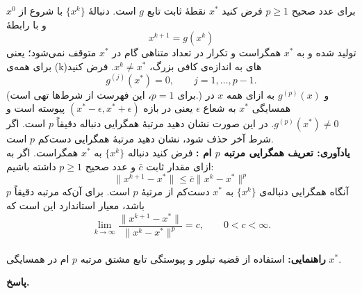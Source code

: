 
برای عدد صحیح
\(p\geq1\)
فرض کنید
\(x^*\)
نقطهٔ ثابت تابع
\(g\)
است. دنبالهٔ
\(\{x^k\}\)
با شروع از
\(x^0\)
و با رابطهٔ
\[
 x^{k+1}=g(x^k)
\]
تولید شده و به
\(x^*\)
همگراست و تکرار در تعداد متناهی گام در
\(x^*\)
متوقف نمی‌شود؛ یعنی برای همه‌ی (k)های به اندازه‌ی کافی بزرگ،
\(x^k\neq x^*\).
فرض کنید
	\[g^{(j)}(x^*)=0,\qquad j=1,\ldots,p-1.\]
	(برای \(p=1\)، این فهرست از شرط‌ها تهی است.)
	و \(g^{(p)}(x)\)
 	به ازای همه 
 	\(x\)
 	در همسایگی
 	\(x^*\)
 	به شعاع
 	\(\epsilon\)
 	یعنی در بازه
 	\((x^* -\epsilon, x^*+\epsilon)\)
	پیوسته است و
	\(g^{(p)}(x^*)\neq0\).
 در این صورت نشان دهید مرتبهٔ همگرایی دنباله
  دقیقاً \(p\)
 است. اگر شرط آخر حذف شود، نشان دهید مرتبهٔ همگرایی دست‌کم \(p\) است.
 \\
\textbf{یادآوری: تعریف همگرایی مرتبه 
	\(p\) ام
	:}
فرض کنید دنباله
\(\{x^k\}\)
به 
\(x^*\)
همگراست. اگر به ازای مقدار ثابت 
\(\bar{c}\)
و عدد صحیح
\(p\geq 1\)
داشته باشیم:
\[\|x^{k+1} - x^*\| \leq \bar{c}\|x^k - x^*\|^p\]
آنگاه همگرایی دنباله‌ی
\(\{x^k\}\)
به 
\(x^*\)
دست‌کم از مرتبهٔ
\(p\)
است. برای آن‌که مرتبه دقیقاً
\(p\)
باشد، معیار استاندارد این است که
\[
\lim_{k\to\infty}
\frac{\|x^{k+1}-x^*\|}{\|x^k-x^*\|^p}
=c,
\qquad 0<c<\infty.
\]
\\
 \textbf{راهنمایی:} استفاده از قضیه تیلور و پیوستگی تابع مشتق مرتبه
\(p\)
ام در همسایگی  
\(x^*\).

\begin{answer}
	
	\textbf{پاسخ.}
	
\end{answer}
